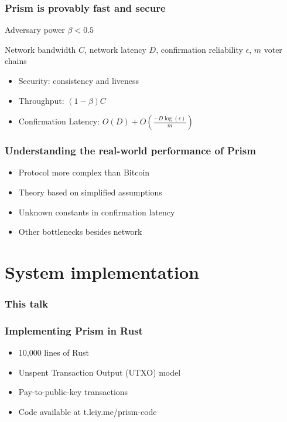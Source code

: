 \documentclass[aspectratio=169]{beamer}
\begin{document}
\begin{frame}
    \frametitle{Prism is provably fast and secure}
    Adversary power $\beta < 0.5$

    Network bandwidth $C$, network latency $D$, confirmation reliability $\epsilon$, $m$ voter chains

    \begin{itemize}
        \item \alert{Security}: consistency and liveness
            \pause
        \item \alert{Throughput}: $(1-\beta)C$
            \pause
        \item \alert{Confirmation Latency}: $O\left(D\right) + O\left(\frac{-D\log\left(\epsilon\right)}{m}\right)$
    \end{itemize}
\end{frame}

\begin{frame}
    \frametitle{Understanding the real-world performance of Prism}
    \begin{itemize}
            \pause
        \item Protocol more complex than Bitcoin
            \pause
        \item Theory based on simplified assumptions 
            \pause
        \item Unknown constants in confirmation latency
            \pause
        \item Other bottlenecks besides network
    \end{itemize}
\end{frame}

\section{System implementation}

\begin{frame}
    \frametitle{This talk}
\end{frame}

\begin{frame}
    \frametitle{Implementing Prism in Rust}
    \begin{itemize}
        \item 10,000 lines of Rust
        \item Unspent Transaction Output (UTXO) model
        \item Pay-to-public-key transactions
        \item Code available at t.leiy.me/prism-code
    \end{itemize}
\end{frame}
\end{document}
